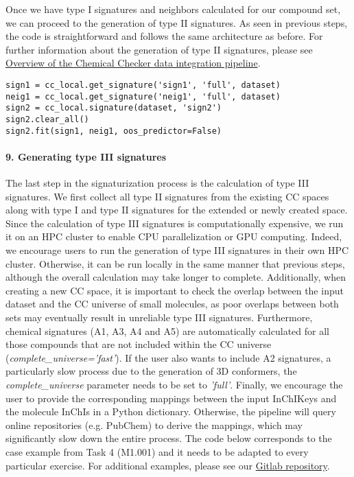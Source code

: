 Once we have type I signatures and neighbors calculated for our compound set, we can proceed to the generation of type II signatures. As seen in previous steps, the code is straightforward and follows the same architecture as before. For further information about the generation of type II signatures, please see \hyperref[Overview of the Chemical Checker data integration pipeline]{Overview of the Chemical Checker data integration pipeline}. \\

\begin{lstlisting}
sign1 = cc_local.get_signature('sign1', 'full', dataset)
neig1 = cc_local.get_signature('neig1', 'full', dataset)
sign2 = cc_local.signature(dataset, 'sign2')
sign2.clear_all()
sign2.fit(sign1, neig1, oos_predictor=False)
\end{lstlisting}


\paragraph{9. Generating type III signatures} \leavevmode

The last step in the signaturization process is the calculation of type III signatures. We first collect all type II signatures from the existing CC spaces along with type I and type II signatures for the extended or newly created space. Since the calculation of type III signatures is computationally expensive, we run it on an HPC cluster to enable CPU parallelization or GPU computing. Indeed, we encourage users to run the generation of type III signatures in their own HPC cluster. Otherwise, it can be run locally in the same manner that previous steps, although the overall calculation may take longer to complete. Additionally, when creating a new CC space, it is important to check the overlap between the input dataset and the CC universe of small molecules, as poor overlaps between both sets may eventually result in unreliable type III signatures. Furthermore, chemical signatures (A1, A3, A4 and A5) are automatically calculated for all those compounds that are not included within the CC universe (\textit{complete\_universe='fast'}). If the user also wants to include A2 signatures, a particularly slow process due to the generation of 3D conformers, the \textit{complete\_universe} parameter needs to be set to \textit{'full'}. Finally, we encourage the user to provide the corresponding mappings between the input InChIKeys and the molecule InChIs in a Python dictionary. Otherwise, the pipeline will query online repositories (e.g. PubChem) to derive the mappings, which may significantly slow down the entire process. The code below corresponds to the case example from Task 4 (M1.001) and it needs to be adapted to every particular exercise. For additional examples, please see our \href{https://gitlabsbnb.irbbarcelona.org/packages/protocols}{Gitlab repository}. \\

